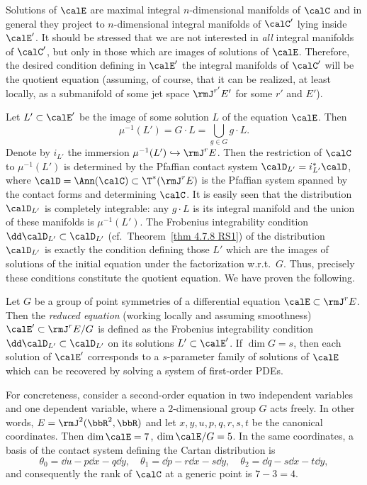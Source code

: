 Solutions of $\calE$ are maximal integral $n$-dimensional manifolds of $\calC$ and in general they project to $n$-dimensional integral manifolds of $\calC'$ lying inside $\calE'$. It should be stressed that we are not interested in \emph{all} integral manifolds of $\calC'$, but only in those which are images of solutions of $\calE$. Therefore, the desired condition defining in $\calE'$ the integral manifolds of $\calC'$ will be the quotient equation (assuming, of course, that it can be realized, at least locally, as a submanifold of some jet space $\rmJ^{r'}E'$ for some $r'$ and $E'$).

Let $L'\subset\calE'$ be the image of some solution $L$ of the equation $\calE$. Then 
\[\mu^{-1}(L')=G\cdot L=\bigcup_{g\in G}g\cdot L.\]
Denote by $i_{L'}$ the immersion $\mu^{-1}(L')\hookrightarrow \rmJ^rE$. Then the restriction of $\calC$ to $\mu^{-1}(L')$ is determined by the Pfaffian contact system $\calD_{L'}=i^\ast_{L'}\calD$, where $\calD=\Ann(\calC)\subset \T^\ast(\rmJ^rE)$ is the Pfaffian system spanned by the contact forms and determining $\calC$. It is easily seen that the distribution $\calD_{L'}$ is completely integrable: any $g\cdot L$ is its integral manifold and the union of these manifolds is $\mu^{-1}(L')$. The Frobenius integrability condition $\dd \calD_{L'}\subset \calD_{L'}$ (cf.\ Theorem~\ref{thm 4.7.8 RS1}) of the distribution $\calD_{L'}$ is exactly the condition defining those $L'$ which are the images of solutions of the initial equation under the factorization w.r.t.\ $G$. Thus, precisely these conditions constitute the quotient equation. We have proven the following.

\begin{prop}
    Let $G$ be a group of point symmetries of a differential equation $\calE\subset\rmJ^r E$. Then the \emph{reduced equation} (working locally and assuming smoothness) $\calE'\subset \rmJ^rE\slash G$ is defined as the Frobenius integrability condition $\dd \calD_{L'}\subset \calD_{L'}$ on its solutions $L'\subset\calE'$. If $\dim G=s$, then each solution of $\calE'$ corresponds to a $s$-parameter family of solutions of $\calE$ which can be recovered by solving a system of first-order PDEs.
\end{prop}

For concreteness, consider a second-order equation in two independent variables and one dependent variable, where a $2$-dimensional group $G$ acts freely. In other words, $E=\rmJ^2(\bbR^2,\bbR)$ and let $x,y,u,p,q,r,s,t$ be the canonical coordinates. Then $\dim\calE=7$, $\dim \calE\slash G=5$. In the same coordinates, a basis of the contact system defining the Cartan distribution is 
\[\theta_0=\dd u-p\dd x-q\dd y,\quad \theta_1=\dd p-r\dd x-s\dd y,\quad \theta_2=\dd q-s\dd x-t\dd y,\]
and consequently the rank of $\calC$ at a generic point is $7-3=4$.

